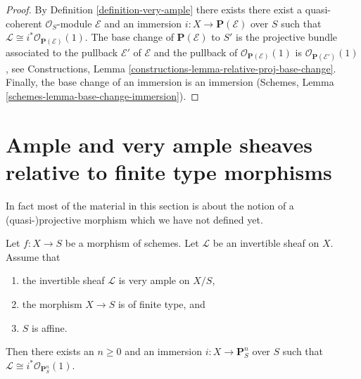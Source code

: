 \begin{proof}
By Definition \ref{definition-very-ample} there exists there exist a
quasi-coherent $\mathcal{O}_S$-module $\mathcal{E}$ and an immersion
$i : X \to \mathbf{P}(\mathcal{E})$ over $S$ such that
$\mathcal{L} \cong i^*\mathcal{O}_{\mathbf{P}(\mathcal{E})}(1)$.
The base change of $\mathbf{P}(\mathcal{E})$ to $S'$ is
the projective bundle associated to the pullback $\mathcal{E}'$
of $\mathcal{E}$ and the pullback of
$\mathcal{O}_{\mathbf{P}(\mathcal{E})}(1)$
is
$\mathcal{O}_{\mathbf{P}(\mathcal{E}')}(1)$, see
Constructions, Lemma \ref{constructions-lemma-relative-proj-base-change}.
Finally, the base change
of an immersion is an immersion
(Schemes, Lemma \ref{schemes-lemma-base-change-immersion}).
\end{proof}







\section{Ample and very ample sheaves relative to finite type morphisms}
\label{section-ample-finite-type}

\noindent
In fact most of the material in this section is about the notion of
a (quasi-)projective morphism which we have not defined yet.

\begin{lemma}
\label{lemma-very-ample-finite-type-over-affine}
Let $f : X \to S$ be a morphism of schemes.
Let $\mathcal{L}$ be an invertible sheaf on $X$.
Assume that
\begin{enumerate}
\item the invertible sheaf $\mathcal{L}$ is very ample on $X/S$,
\item the morphism $X \to S$ is of finite type, and
\item $S$ is affine.
\end{enumerate}
Then there exists an $n \geq 0$ and an immersion
$i : X \to \mathbf{P}^n_S$ over $S$ such that
$\mathcal{L} \cong i^*\mathcal{O}_{\mathbf{P}^n_S}(1)$.
\end{lemma}

